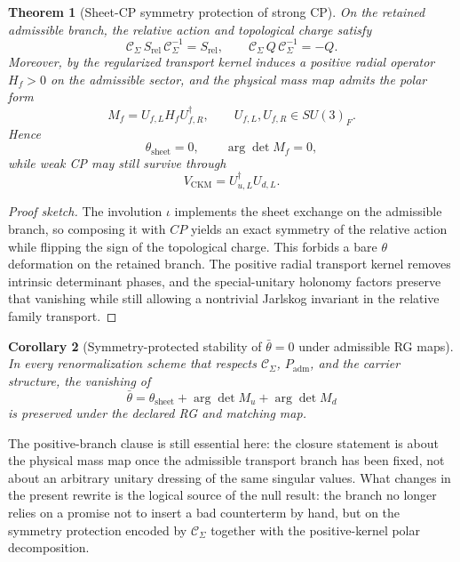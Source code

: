 \documentclass[11pt,a4paper]{article}
\newtheorem{theorem}{Theorem}[section]
\newtheorem{corollary}[theorem]{Corollary}
\theoremstyle{definition}
\theoremstyle{remark}
\newcommand{\inv}{\iota}
\newcommand{\Padm}{P_{\mathrm{adm}}}
\begin{document}
\begin{theorem}[Sheet-CP symmetry protection of strong CP]
\label{thm:sheet-cp-protection}
On the retained admissible branch, the relative action and topological charge satisfy
\[
\mathcal C_\Sigma\,S_{\mathrm{rel}}\,\mathcal C_\Sigma^{-1}=S_{\mathrm{rel}},
\qquad
\mathcal C_\Sigma\,Q\,\mathcal C_\Sigma^{-1}=-Q.
\]
Moreover, by  the regularized transport kernel induces a positive radial operator $H_f>0$ on the admissible sector, and the physical mass map admits the polar form
\[
M_f=U_{f,L}H_fU_{f,R}^\dagger,
\qquad
U_{f,L},U_{f,R}\in SU(3)_F.
\]
Hence
\[
\theta_{\mathrm{sheet}}=0,
\qquad
\arg\det M_f=0,
\]
while weak CP may still survive through
\[
V_{\mathrm{CKM}}=U_{u,L}^\dagger U_{d,L}.
\]
\end{theorem}

\begin{proof}[Proof sketch]
The involution $\inv$ implements the sheet exchange on the admissible branch, so composing it with $CP$ yields an exact symmetry of the relative action while flipping the sign of the topological charge. This forbids a bare $\theta$ deformation on the retained branch. The positive radial transport kernel removes intrinsic determinant phases, and the special-unitary holonomy factors preserve that vanishing while still allowing a nontrivial Jarlskog invariant in the relative family transport.
\end{proof}

\begin{corollary}[Symmetry-protected stability of $\bar\theta=0$ under admissible RG maps]
\label{cor:strong-cp-rg-stability}
In every renormalization scheme that respects $\mathcal C_\Sigma$, $\Padm$, and the carrier structure, the vanishing of
\[
\bar\theta=\theta_{\mathrm{sheet}}+\arg\det M_u+\arg\det M_d
\]
is preserved under the declared RG and matching map.
\end{corollary}

The positive-branch clause is still essential here: the closure statement is about the physical mass map once the admissible transport branch has been fixed, not about an arbitrary unitary dressing of the same singular values. What changes in the present rewrite is the logical source of the null result: the branch no longer relies on a promise not to insert a bad counterterm by hand, but on the symmetry protection encoded by $\mathcal C_\Sigma$ together with the positive-kernel polar decomposition.
\end{document}
